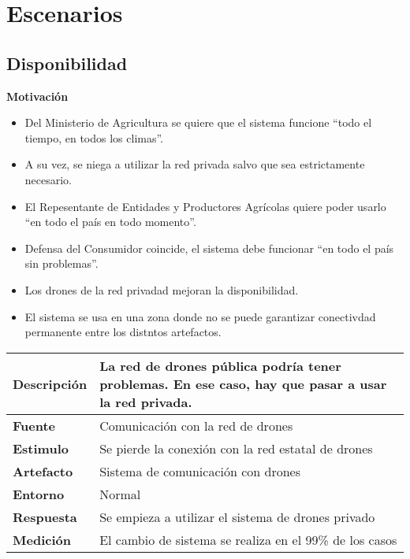 \section{Escenarios}
\subsection{Disponibilidad}
\textbf{Motivación}
\begin{itemize}
 \item Del Ministerio de Agricultura se quiere que el sistema funcione ``todo el tiempo, en todos los climas''.
 \item A su vez, se niega a utilizar la red privada salvo que sea estrictamente necesario.
 \item El Repesentante de Entidades y Productores Agrícolas quiere poder usarlo ``en todo el país en todo momento''.
 \item Defensa del Consumidor coincide, el sistema debe funcionar ``en todo el país sin problemas''.
 \item Los drones de la red privadad mejoran la disponibilidad.
 \item El sistema se usa en una zona donde no se puede garantizar conectivdad permanente entre los distntos artefactos.
\end{itemize}


\begin{tabular}{| l || p{12cm} |}
\hline 
\textbf{Descripci\'on} & La red de drones pública podría tener problemas. En ese caso, hay que pasar a usar la red privada. \\
\hline 
\textbf{Fuente} & Comunicación con la red de drones \\
\hline 
\textbf{Estimulo} & Se pierde la conexi\'on con la red estatal de drones \\
\hline 
\textbf{Artefacto} & Sistema de comunicación con drones \\
\hline 
\textbf{Entorno} & Normal \\
\hline 
\textbf{Respuesta} & Se empieza a utilizar el sistema de drones privado \\
\hline 
\textbf{Medici\'on} & El cambio de sistema se realiza en el 99\% de los casos \\
\hline 
\end{tabular}

\medskip

